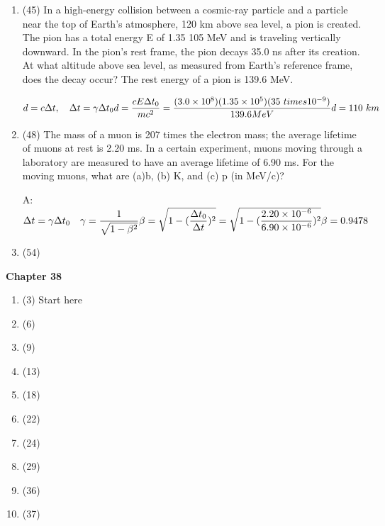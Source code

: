 \documentclass[fleqn]{article}
\begin{document}
\begin{enumerate}
    \item (45) In a high-energy collision between a cosmic-ray particle and a particle near the top of Earth’s atmosphere, 120 km above sea
    level, a pion is created. The pion has a total energy E of 1.35  105 MeV and is traveling vertically downward. In the pion’s rest frame,
    the pion decays 35.0 ns after its creation. At what altitude above sea level, as measured from Earth’s reference frame, does the decay occur? The rest energy of a pion is 139.6 MeV.

      \textcolor{hwColor}{
        $
          d=c\Delta t, ~~~ \Delta t=\gamma \Delta t_0 \\
          d=\dfrac{cE \Delta t_0}{mc^2}=\dfrac{(3.0 \times 10^8)(1.35 \times 10^5)(35 \ times 10^{-9})}{139.6 MeV} \\
          \\
          d=110 ~ km
        $
      }

    \item (48) The mass of a muon is 207 times the electron mass; the average lifetime of muons at rest is 2.20 ms. In a certain experiment, muons moving through a laboratory are measured to have
    an average lifetime of 6.90 ms. For the moving muons, what are (a)b, (b) K, and (c) p (in MeV/c)?

      \textcolor{hwColor}{
        A: \\
        $
          \Delta t=\gamma \Delta t_0 ~~~ \gamma=\dfrac{1}{\sqrt{1-\beta^2}} \\
          \beta = \sqrt{1-(\dfrac{\Delta t_0}{\Delta t})^2}=\sqrt{1-(\dfrac{2.20 \times 10^{-6}}{6.90 \times 10^{-6}})^2} \\
          \\
          \beta=0.9478
        $
      }

    \item (54)
  \end{enumerate}

  \textbf{Chapter 38}
  \begin{enumerate}
    \item (3) Start here
    \item (6)
    \item (9)
    \item (13)
    \item (18)
    \item (22)
    \item (24)
    \item (29)
    \item (36)
    \item (37)
  \end{enumerate}
  
\end{document}
